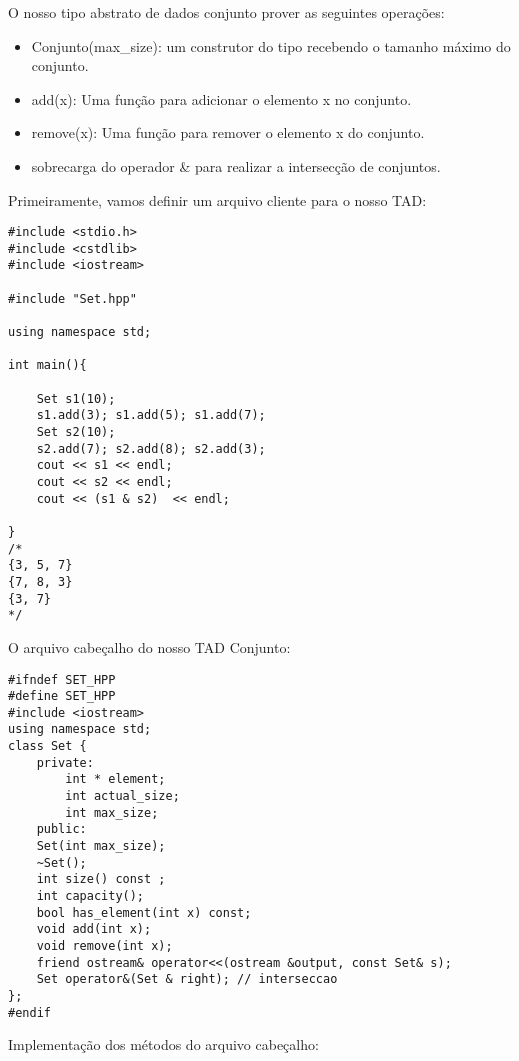 O nosso tipo abstrato de dados conjunto prover as seguintes operações:

\begin{itemize}
    \item Conjunto(max\_size): um construtor do tipo recebendo o tamanho máximo do conjunto.
    \item add(x): Uma função para adicionar o elemento x no conjunto.
    \item remove(x): Uma função para remover o elemento x do conjunto.
    \item sobrecarga do operador \& para realizar a intersecção de conjuntos.
\end{itemize}


Primeiramente, vamos definir um arquivo cliente para o nosso TAD:

\begin{verbatim}
#include <stdio.h>
#include <cstdlib>
#include <iostream>

#include "Set.hpp"

using namespace std;

int main(){

	Set s1(10);
	s1.add(3); s1.add(5); s1.add(7);
	Set s2(10);
	s2.add(7); s2.add(8); s2.add(3);
	cout << s1 << endl;
	cout << s2 << endl;
	cout << (s1 & s2)  << endl;
		
}
/*
{3, 5, 7}
{7, 8, 3}
{3, 7}
*/
\end{verbatim}

O arquivo cabeçalho do nosso TAD Conjunto:

\begin{verbatim}
#ifndef SET_HPP
#define SET_HPP
#include <iostream>
using namespace std;
class Set {
	private:
		int * element;
		int actual_size;
		int max_size;
	public:
    Set(int max_size);
    ~Set();
    int size() const ;
    int capacity();		
    bool has_element(int x) const;
    void add(int x);
    void remove(int x);
    friend ostream& operator<<(ostream &output, const Set& s);
    Set operator&(Set & right); // interseccao
};
#endif

\end{verbatim}

Implementação dos métodos do arquivo cabeçalho:

